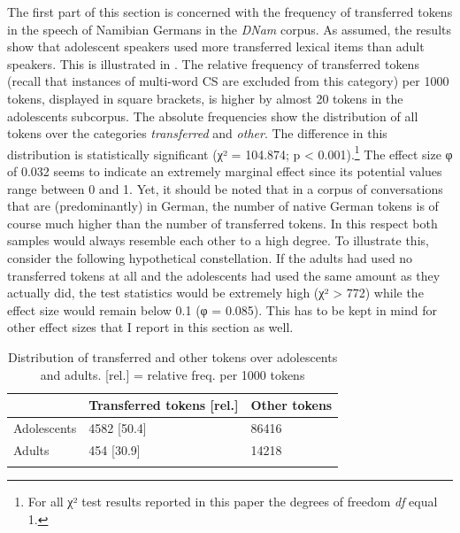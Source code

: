 \documentclass[output=paper]{langsci/langscibook}
\begin{document}
The first part of this section is concerned with the frequency of transferred tokens in the speech of Namibian Germans in the \textit{DNam} corpus. As assumed, the results show that adolescent speakers used more transferred lexical items than adult speakers. This is illustrated in . The relative frequency of transferred tokens (recall that instances of multi-word CS are excluded from this category) per 1000 tokens, displayed in square brackets, is higher by almost 20 tokens in the adolescents subcorpus. The absolute frequencies show the distribution of all tokens over the categories \textit{transferred} and \textit{other}. The difference in this distribution is statistically significant (χ² = 104.874; p < 0.001).\footnote{For all χ² test results reported in this paper the degrees of freedom \textit{df} equal 1.} The effect size φ of 0.032 seems to indicate an extremely marginal effect since its potential values range between 0 and 1. Yet, it should be noted that in a corpus of conversations that are (predominantly) in German, the number of native German tokens is of course much higher than the number of transferred tokens. In this respect both samples would always resemble each other to a high degree. To illustrate this, consider the following hypothetical constellation. If the adults had used no transferred tokens at all and the adolescents had used the same amount as they actually did, the test statistics would be extremely high (χ² > 772) while the effect size would remain below 0.1 (φ = 0.085). This has to be kept in mind for other effect sizes that I report in this section as well.

  

  
\begin{table}
\centering
\begin{tabularx}{0.6\textwidth}{XYY} 
\lsptoprule
& Transferred tokens {[}rel.{]} & Other tokens\\
\hline
{Adolescents} & {4582 {[}50.4{]}} & {86416}\\
{Adults} & {454 {[}30.9{]}} & {14218}\\
\lspbottomrule
\end{tabularx}
\caption{Distribution of transferred and other tokens over adolescents and adults. {[}rel.{]} = relative freq. per 1000 tokens}
\label{tab:bracke:3}
\end{table}  
\end{document}
